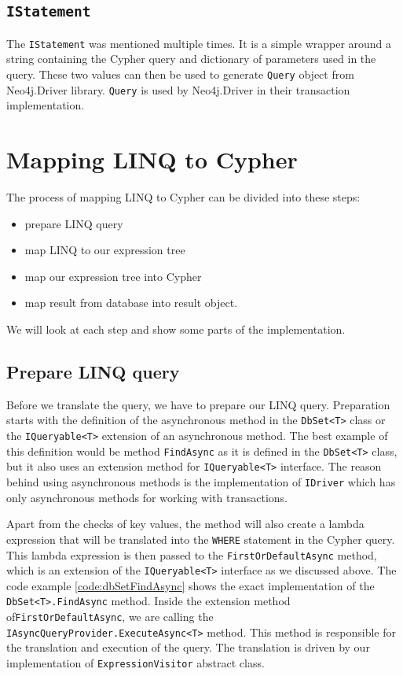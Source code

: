 \subsection{\texttt{IStatement}}

The \texttt{IStatement} was mentioned multiple times.
It is a simple wrapper around a string containing the Cypher query and dictionary of parameters used in the query.
These two values can then be used to generate \texttt{Query} object from Neo4j.Driver library.
\texttt{Query} is used by Neo4j.Driver in their transaction implementation.

\pagebreak

\section{Mapping LINQ to Cypher}

The process of mapping LINQ to Cypher can be divided into these steps:
\begin{itemize}
    \item {prepare LINQ query}
    \item {map LINQ to our expression tree}
    \item {map our expression tree into Cypher}
    \item {map result from database into result object.}
\end{itemize}
We will look at each step and show some parts of the implementation.

\subsection{Prepare LINQ query}

Before we translate the query, we have to prepare our LINQ query.
Preparation starts with the definition of the asynchronous method in the \texttt{DbSet<T>} class or the \texttt{IQueryable<T>} extension of an asynchronous method.
The best example of this definition would be method \texttt{FindAsync} as it is defined in the \texttt{DbSet<T>} class, but it also uses an extension method for \texttt{IQueryable<T>} interface.
The reason behind using asynchronous methods is the implementation of \texttt{IDriver} which has only asynchronous methods for working with transactions.

Apart from the checks of key values, the method will also create a lambda expression that will be translated into the \texttt{WHERE} statement in the Cypher query.
This lambda expression is then passed to the \texttt{FirstOrDefaultAsync} method, which is an extension of the \texttt{IQueryable<T>} interface as we discussed above.
The code example \ref{code:dbSetFindAsync} shows the exact implementation of the \texttt{DbSet<T>.FindAsync} method.
Inside the extension method of\linebreak\texttt{FirstOrDefaultAsync}, we are calling the \texttt{IAsyncQueryProvider.\linebreak ExecuteAsync<T>} method.
This method is responsible for the translation and execution of the query. The translation is driven by our implementation of \texttt{ExpressionVisitor} abstract class.

